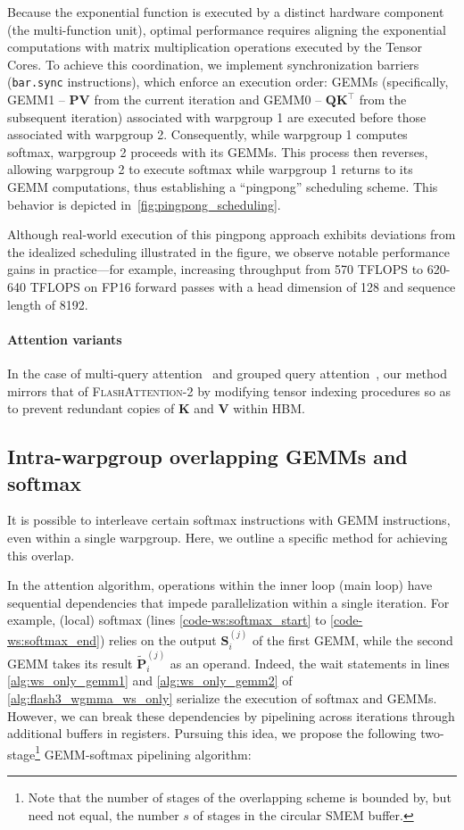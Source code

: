 \begin{enumerate}
Because the exponential function is executed by a distinct hardware component (the multi-function unit), optimal performance requires aligning the exponential computations with matrix multiplication operations executed by the Tensor Cores. To achieve this coordination, we implement synchronization barriers (\texttt{bar.sync} instructions), which enforce an execution order: GEMMs (specifically, GEMM1 -- $\mathbf{P} \mathbf{V}$ from the current iteration and GEMM0 -- $\mathbf{Q} \mathbf{K}^\top$ from the subsequent iteration) associated with warpgroup 1 are executed before those associated with warpgroup 2. Consequently, while warpgroup 1 computes softmax, warpgroup 2 proceeds with its GEMMs. This process then reverses, allowing warpgroup 2 to execute softmax while warpgroup 1 returns to its GEMM computations, thus establishing a “pingpong” scheduling scheme. This behavior is depicted in~\cref{fig:pingpong_scheduling}. 

Although real-world execution of this pingpong approach exhibits deviations from the idealized scheduling illustrated in the figure, we observe notable performance gains in practice—for example, increasing throughput from 570 TFLOPS to 620-640 TFLOPS on FP16 forward passes with a head dimension of 128 and sequence length of 8192.

\paragraph{Attention variants} In the case of multi-query attention~\citep{shazeer2019fast} and grouped query attention~\citep{ainslie2023gqa}, our method mirrors that of \textsc{FlashAttention-2} by modifying tensor indexing procedures so as to prevent redundant copies of $\mathbf{K}$ and $\mathbf{V}$ within HBM.

\subsection{Intra-warpgroup overlapping GEMMs and softmax}

It is possible to interleave certain softmax instructions with GEMM instructions, even within a single warpgroup. Here, we outline a specific method for achieving this overlap.

In the attention algorithm, operations within the inner loop (main loop) have sequential dependencies that impede parallelization within a single iteration. For example, (local) softmax (lines \ref{code-ws:softmax_start} to \ref{code-ws:softmax_end}) relies on the output $\mathbf{S}_i^{(j)}$ of the first GEMM, while the second GEMM takes its result $\widetilde{\mathbf{P}}_i^{(j)}$ as an operand. Indeed, the wait statements in lines \ref{alg:ws_only_gemm1} and \ref{alg:ws_only_gemm2} of \cref{alg:flash3_wgmma_ws_only} serialize the execution of softmax and GEMMs. However, we can break these dependencies by pipelining across iterations through additional buffers in registers. Pursuing this idea, we propose the following two-stage\footnote{Note that the number of stages of the overlapping scheme is bounded by, but need not equal, the number $s$ of stages in the circular SMEM buffer.} GEMM-softmax pipelining algorithm:


\end{enumerate}

